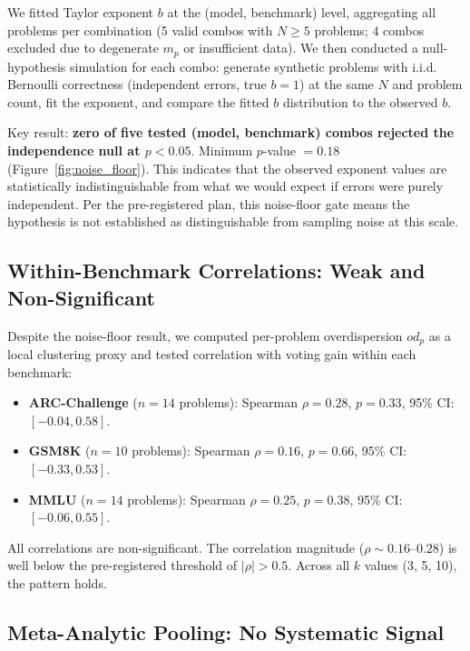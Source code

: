 \documentclass[11pt,letterpaper]{article}
\begin{document}
We fitted Taylor exponent $b$ at the (model, benchmark) level, aggregating all problems per combination (5 valid combos with $N \geq 5$ problems; 4 combos excluded due to degenerate $m_p$ or insufficient data). We then conducted a null-hypothesis simulation for each combo: generate synthetic problems with i.i.d. Bernoulli correctness (independent errors, true $b = 1$) at the same $N$ and problem count, fit the exponent, and compare the fitted $b$ distribution to the observed $b$.

Key result: \textbf{zero of five tested (model, benchmark) combos rejected the independence null at $p < 0.05$}. Minimum $p$-value $= 0.18$ (Figure~\ref{fig:noise_floor}). This indicates that the observed exponent values are statistically indistinguishable from what we would expect if errors were purely independent. Per the pre-registered plan, this noise-floor gate means the hypothesis is not established as distinguishable from sampling noise at this scale.

\subsection{Within-Benchmark Correlations: Weak and Non-Significant}

Despite the noise-floor result, we computed per-problem overdispersion $od_p$ as a local clustering proxy and tested correlation with voting gain within each benchmark:

\begin{itemize}
  \item \textbf{ARC-Challenge} ($n=14$ problems): Spearman $\rho = 0.28$, $p = 0.33$, 95\% CI: $[-0.04, 0.58]$.
  \item \textbf{GSM8K} ($n=10$ problems): Spearman $\rho = 0.16$, $p = 0.66$, 95\% CI: $[-0.33, 0.53]$.
  \item \textbf{MMLU} ($n=14$ problems): Spearman $\rho = 0.25$, $p = 0.38$, 95\% CI: $[-0.06, 0.55]$.
\end{itemize}

All correlations are non-significant. The correlation magnitude ($\rho \sim 0.16$--$0.28$) is well below the pre-registered threshold of $|\rho| > 0.5$. Across all $k$ values (3, 5, 10), the pattern holds.

\subsection{Meta-Analytic Pooling: No Systematic Signal}
\end{document}
